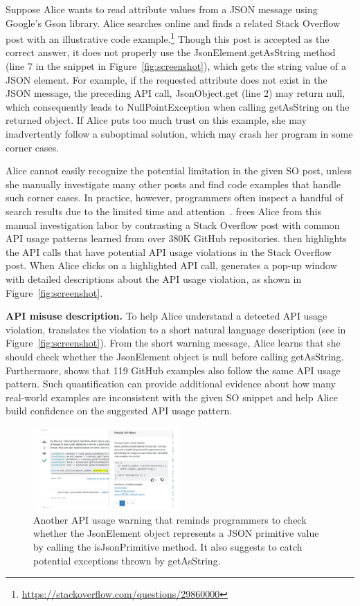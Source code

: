Suppose Alice wants to read attribute values from a {\ttt JSON} message using Google's Gson library. Alice searches online and finds a related Stack Overflow post with an illustrative code example.\footnote{\url{https://stackoverflow.com/questions/29860000}} Though this post is accepted as the correct answer, it does not properly use the {\ttt JsonElement.getAsString} method (line 7 in the snippet in Figure~\ref{fig:screenshot}), which gets the {\ttt string} value of a {\ttt JSON} element. For example, if the requested attribute does not exist in the {\ttt JSON} message, the preceding API call, {\ttt JsonObject.get} (line 2) may return {\ttt null}, which consequently leads to {\ttt NullPointException} when calling {\ttt getAsString} on the returned object. If Alice puts too much trust on this example, she may inadvertently follow a suboptimal solution, which may crash her program in some corner cases. 

Alice cannot easily recognize the potential limitation in the given SO post, unless she manually investigate many other posts and find code examples that handle such corner cases. In practice, however, programmers often inspect a handful of search results due to the limited time and attention~\cite{brandt2009two, starke2009working}. {\tool} frees Alice from this manual investigation labor by contrasting a Stack Overflow post with common API usage patterns learned from over 380K GitHub repositories. {\tool} then highlights the API calls that have potential API usage violations in the Stack Overflow post. When Alice clicks on a highlighted API call, {\tool} generates a pop-up window with detailed descriptions about the API usage violation, as shown in Figure~\ref{fig:screenshot}.

{\bf API misuse description.} To help Alice understand a detected API usage violation, {\tool} translates the violation to a short natural language description (see  in Figure~\ref{fig:screenshot}). From the short warning message, Alice learns that she should check whether the {\ttt JsonElement} object is {\ttt null} before calling {\ttt getAsString}. Furthermore, {\tool} shows that 119 GitHub examples also follow the same API usage pattern. Such quantification can provide additional evidence about how many real-world examples are inconsistent with the given SO snippet and help Alice build confidence on the suggested API usage pattern.

\begin{figure}
\centering
\includegraphics[width=0.5\textwidth]{soap-v4-2.pdf}
  \caption{Another API usage warning that reminds programmers to check whether the {\ttt JsonElement} object represents a {\ttt JSON} primitive value by calling the {\ttt isJsonPrimitive} method. It also suggests to catch potential exceptions thrown by {\ttt getAsString}.}
  \label{fig:screenshot2}
\end{figure}

